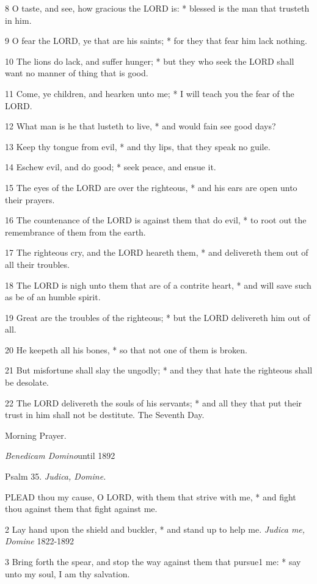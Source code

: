8 O taste, and see, how gracious the LORD
is: * blessed is the man that trusteth in him.

9 O fear the LORD, ye that are
his saints; * for they that fear him lack nothing.

10 The lions do lack, and suffer hunger; * but they
who seek the LORD shall want no manner of thing
that is good.

11 Come, ye children, and hearken unto me; * I will
teach you the fear of the LORD.

12 What man is he that lusteth to live, * and would
fain see good days?

13 Keep thy tongue from evil, * and thy lips, that
they speak no guile.

14 Eschew evil, and do good; * seek peace, and ensue
it.

15 The eyes of the LORD are
over the righteous, * and his ears are open unto their prayers.

16 The countenance of the LORD
is against them that do evil, * to root out the remembrance of them from
the earth.

17 The righteous cry, and the LORD
heareth them, * and delivereth them out of all their troubles.

18 The LORD is nigh unto them
that are of a contrite heart, * and will save such as be of an humble
spirit.

19 Great are the troubles of the righteous; * but the
LORD delivereth him out of all.

20 He keepeth all his bones, * so that not one of them
is broken.

21 But misfortune shall slay the ungodly; * and they
that hate the righteous shall be desolate.

22 The LORD delivereth the souls
of his servants; * and all they that put their trust in him shall not
be destitute.
The
Seventh Day.

Morning
Prayer.

\emph{Benedicam Domino}until
1892

Psalm
35. \emph{Judica, Domine.}

PLEAD
thou my cause, O LORD, with them that strive with
me, * and fight thou against them that fight against me.

2 Lay hand upon the shield and buckler, * and stand
up to help me. \emph{Judica me, Domine} 1822-1892

3 Bring forth the spear, and stop the way against them
that pursue1 me: * say unto my soul, I am thy salvation.

